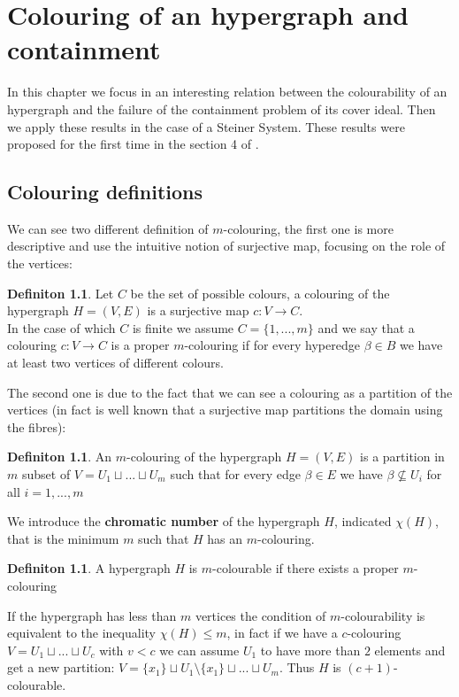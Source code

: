 \documentclass[a4wide]{book}
\theoremstyle{plain}
\theoremstyle{remark}
\theoremstyle{definition}
\newtheorem{deff}[teo]{Definiton}
\begin{document}
 

\chapter{Colouring of an hypergraph and containment}

In this chapter we focus in an interesting relation between the colourability of an hypergraph and  the failure of the containment problem of its cover ideal. Then we apply these results in the case of a Steiner System. These results were proposed for the first time in the section 4 of \cite{Bal21Steiner}.
 
\section{Colouring definitions}

We can see two different definition of $ m $-colouring, the first one is more descriptive and use the intuitive notion of surjective map, focusing on the role of the vertices: 
\begin{deff}\label{def:colouring1}
Let $ C $ be the set of possible colours, a colouring of the hypergraph $ H = (V,E) $ is a surjective map $ c : V \to C $. \\
In the case of which $ C $ is finite we assume $ C = \{ 1 , ... , m\} $ and we say that a colouring $ c : V \to C $ is a proper $ m $-colouring if for every hyperedge $ \beta \in B $ we have at least two vertices of different colours. 
\end{deff}

The second one is due to the fact that we can see a colouring as a partition of the vertices (in fact is well known that a surjective map partitions the domain using the fibres):

\begin{deff}
An $ m $-colouring of the hypergraph $ H = (V,E) $ is a partition in $ m $ subset of $ V = U_1 \sqcup ... \sqcup U_m $ such that for every edge $ \beta \in E $ we have $ \beta \not \subseteq U_i $ for all $ i = 1, ... , m $
\end{deff}
 
We introduce the \textbf{chromatic number} of the hypergraph $ H $, indicated $ \chi(H) $, that is the minimum $ m $ such that $ H $ has an $ m $-colouring.

\begin{deff}
A hypergraph $ H $ is $ m $-colourable if there exists a proper $ m $-colouring
\end{deff}

If the hypergraph has less than $ m $ vertices the condition of $ m $-colourability is equivalent to the inequality $ \chi(H) \leq m $, in fact if we have a $ c $-colouring $ V = U_1 \sqcup ... \sqcup U_c $ with $ v < c $ we can assume $ U_1 $ to have more than $ 2 $ elements and get a new partition: $ V = \{x_1\} \sqcup U_1 \setminus \{x_1\} \sqcup ... \sqcup U_m $. Thus $ H $ is $ (c+1) $-colourable. 
\end{document}
